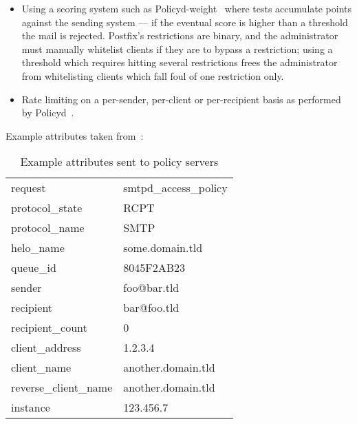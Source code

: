 \begin{itemize}
    \item Using a scoring system such as
        Policyd-weight~\cite{policyd-weight} where tests accumulate points
        against the sending system --- if the eventual score is higher than
        a threshold the mail is rejected.  Postfix's restrictions are
        binary, and the administrator must manually whitelist clients if
        they are to bypass a restriction; using a threshold which requires
        hitting several restrictions frees the administrator from
        whitelisting clients which fall foul of one restriction only.

    \item Rate limiting on a per-sender, per-client or per-recipient basis
        as performed by Policyd~\cite{policyd}.

\end{itemize}

Example attributes taken from~\cite{policy-servers}:

\begin{table}[ht]

    \caption{Example attributes sent to policy servers}\label{Example
    attributes sent to policy servers}

    \begin{tabular}[]{ll}

        request                 & smtpd\_access\_policy     \\
        protocol\_state         & RCPT                      \\
        protocol\_name          & SMTP                      \\
        helo\_name              & some.domain.tld           \\
        queue\_id               & 8045F2AB23                \\
        sender                  & foo@bar.tld               \\
        recipient               & bar@foo.tld               \\
        recipient\_count        & 0                         \\
        client\_address         & 1.2.3.4                   \\
        client\_name            & another.domain.tld        \\
        reverse\_client\_name   & another.domain.tld        \\
        instance                & 123.456.7                 \\

    \end{tabular}
\end{table}



